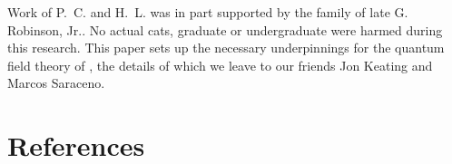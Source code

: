 \documentclass[12pt]{iopart}
\begin{document}

    \ifboyscout\clearpage\fi

    \ifboyscout\clearpage\fi



    \ifboyscout\clearpage\fi

    \ifboyscout\clearpage\fi

    \ifboyscout\clearpage\fi

    \ifboyscout\clearpage\fi

    \ifboyscout\clearpage\fi

    \ifboyscout\clearpage\fi

    \ifboyscout\clearpage\fi

\ack
Work of P.~C. and H.~L. was in part supported by the family of late G. Robinson,
Jr..
No actual cats, graduate or undergraduate %
were harmed during this research. This paper sets up the necessary
underpinnings for the quantum field theory of \catlatt, the details of
which we leave to our %
friends Jon Keating and Marcos Saraceno.



%

    \ifsubmission
\section*{References}

    \else
\printbibliography[
heading=bibintoc,
title={References}
				  ] %
    \fi
\end{document}
